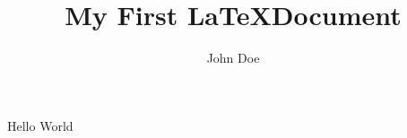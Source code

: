 \documentclass[11pt, a4paper]{report}
\title{My First \LaTeX Document}
\author{John Doe}
\begin{document}
\maketitle

Hello World
\end{document}
